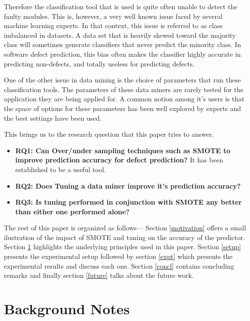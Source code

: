 \documentclass[10pt, journal, compsoc]{IEEEtran}
\begin{document}
Therefore the classification tool that is used is quite often unable to detect the faulty modules. This is, however, a very well known issue faced by several machine learning experts. In that context, this issue is referred to as class imbalanced in datasets. A data set that is heavily skewed toward the majority class will sometimes generate classifiers that never predict the minority class. In software defect prediction, this bias often makes the classifier highly accurate in predicting non-defects, and totally useless for predicting defects.

One of the other issue in data mining is the choice of parameters that run these classification tools. The parameters of these data miners are rarely tested for the application they are being applied for. A common notion among it's users is that the space of options for these parameters has been well explored by experts and the best settings have been used.

This brings us to the research question that this paper tries to answer.
\begin{itemize}
\item {\bfseries RQ1:  Can Over/under sampling techniques such as SMOTE to improve prediction accuracy for defect prediction?} It has been established to be a useful tool.
\item {\bfseries RQ2: Does Tuning a data miner improve it's prediction accuracy?}
\item {\bfseries RQ3: Is tuning performed in conjunction with SMOTE any better than either one performed alone?}
\end{itemize}



The rest of this paper is organized as follows--- Section \ref*{motivation} offers a small ilustration of the impact of SMOTE and tuning on the accuracy of the predictor. Section \ref*{back} highlights the underlying principles used in this paper. Section \ref{setup} presents the experimental setup followed by section \ref{expt} which presents the experimental results and discuss each one. Section \ref{concl} contains concluding remarks and finally section \ref{future} talks about the future work.
\section{Background Notes}
\label{back}
\end{document}
